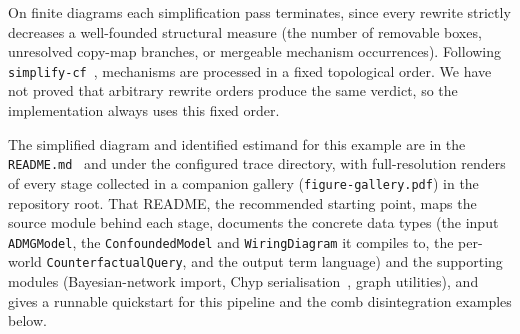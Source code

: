 \documentclass[runningheads]{llncs}
\begin{document}
On finite diagrams each simplification pass terminates, since every rewrite strictly decreases a well-founded structural measure (the number of removable boxes, unresolved copy-map branches, or mergeable mechanism occurrences). Following \texttt{simplify-cf}~\cite{lorenz2023causal}, mechanisms are processed in a fixed topological order. We have not proved that arbitrary rewrite orders produce the same verdict, so the implementation always uses this fixed order.

The simplified diagram and identified estimand for this example are in the \texttt{README.md}~\cite{idcf_tool} and under the configured trace directory, with full-resolution renders of every stage collected in a companion gallery (\texttt{figure-gallery.pdf}) in the repository root. That README, the recommended starting point, maps the source module behind each stage, documents the concrete data types (the input \texttt{ADMGModel}, the \texttt{ConfoundedModel} and \texttt{WiringDiagram} it compiles to, the per-world \texttt{CounterfactualQuery}, and the output term language) and the supporting modules (Bayesian-network import, Chyp serialisation~\cite{chyp2024}, graph utilities), and gives a runnable quickstart for this pipeline and the comb disintegration examples below.
\end{document}
